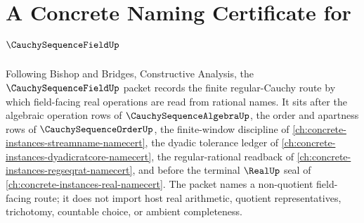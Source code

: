 \chapter{A Concrete Naming Certificate for $\CauchySequenceFieldUp$}
\label{ch:concrete-instances-cauchy-sequence-field-namecert}

Following Bishop and Bridges, Constructive Analysis, the $\CauchySequenceFieldUp$ packet records the finite regular-Cauchy route by which field-facing real operations are read from rational names. It sits after the algebraic operation rows of $\CauchySequenceAlgebraUp$, the order and apartness rows of $\CauchySequenceOrderUp$, the finite-window discipline of \autoref{ch:concrete-instances-streamname-namecert}, the dyadic tolerance ledger of \autoref{ch:concrete-instances-dyadicratcore-namecert}, the regular-rational readback of \autoref{ch:concrete-instances-regseqrat-namecert}, and before the terminal $\RealUp$ seal of \autoref{ch:concrete-instances-real-namecert}. The packet names a non-quotient field-facing route; it does not import host real arithmetic, quotient representatives, trichotomy, countable choice, or ambient completeness.

